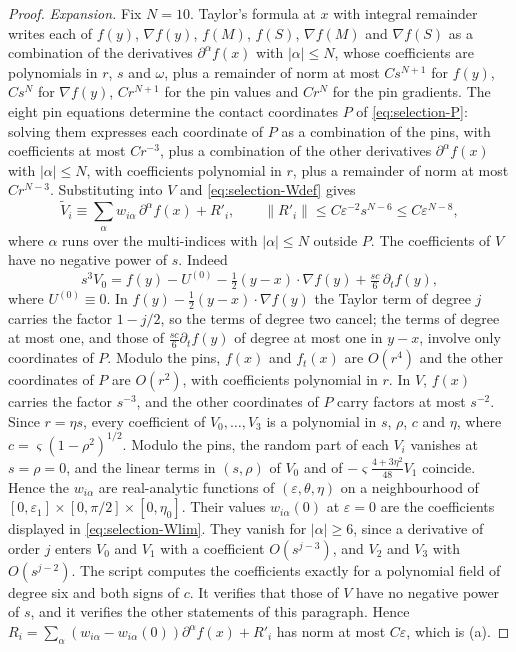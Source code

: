 \begin{proof}
\emph{Expansion.} Fix $N=10$. Taylor's formula at $x$ with integral remainder writes each of $f(y)$, $\nabla f(y)$, $f(M)$, $f(S)$, $\nabla f(M)$ and $\nabla f(S)$ as a combination of the derivatives $\partial^\alpha f(x)$ with $|\alpha|\le N$, whose coefficients are polynomials in $r$, $s$ and $\omega$, plus a remainder of norm at most $Cs^{N+1}$ for $f(y)$, $Cs^N$ for $\nabla f(y)$, $Cr^{N+1}$ for the pin values and $Cr^N$ for the pin gradients. The eight pin equations determine the contact coordinates $P$ of \eqref{eq:selection-P}: solving them expresses each coordinate of $P$ as a combination of the pins, with coefficients at most $Cr^{-3}$, plus a combination of the other derivatives $\partial^\alpha f(x)$ with $|\alpha|\le N$, with coefficients polynomial in $r$, plus a remainder of norm at most $Cr^{N-3}$. Substituting into $V$ and \eqref{eq:selection-Wdef} gives
\[
\tilde V_i\equiv\sum_\alpha w_{i\alpha}\,\partial^\alpha f(x)+R'_i,\qquad\|R'_i\|\le C\varepsilon^{-2}s^{N-6}\le C\varepsilon^{N-8},
\]
where $\alpha$ runs over the multi-indices with $|\alpha|\le N$ outside $P$. The coefficients of $V$ have no negative power of $s$. Indeed
\[
s^3V_0=f(y)-U^{(0)}-\tfrac12(y-x)\cdot\nabla f(y)+\tfrac{sc}6\,\partial_tf(y),
\]
where $U^{(0)}\equiv0$. In $f(y)-\frac12(y-x)\cdot\nabla f(y)$ the Taylor term of degree $j$ carries the factor $1-j/2$, so the terms of degree two cancel; the terms of degree at most one, and those of $\frac{sc}6\partial_tf(y)$ of degree at most one in $y-x$, involve only coordinates of $P$. Modulo the pins, $f(x)$ and $f_t(x)$ are $O(r^4)$ and the other coordinates of $P$ are $O(r^2)$, with coefficients polynomial in $r$. In $V$, $f(x)$ carries the factor $s^{-3}$, and the other coordinates of $P$ carry factors at most $s^{-2}$. Since $r=\eta s$, every coefficient of $V_0,\dots,V_3$ is a polynomial in $s$, $\rho$, $c$ and $\eta$, where $c=\varsigma(1-\rho^2)^{1/2}$. Modulo the pins, the random part of each $V_i$ vanishes at $s=\rho=0$, and the linear terms in $(s,\rho)$ of $V_0$ and of $-\varsigma\frac{4+3\eta^2}{48}V_1$ coincide. Hence the $w_{i\alpha}$ are real-analytic functions of $(\varepsilon,\theta,\eta)$ on a neighbourhood of $[0,\varepsilon_1]\times[0,\pi/2]\times[0,\eta_0]$. Their values $w_{i\alpha}(0)$ at $\varepsilon=0$ are the coefficients displayed in \eqref{eq:selection-Wlim}. They vanish for $|\alpha|\ge6$, since a derivative of order $j$ enters $V_0$ and $V_1$ with a coefficient $O(s^{j-3})$, and $V_2$ and $V_3$ with $O(s^{j-2})$. The script  computes the coefficients exactly for a polynomial field of degree six and both signs of $c$. It verifies that those of $V$ have no negative power of $s$, and it verifies the other statements of this paragraph. Hence $R_i=\sum_\alpha(w_{i\alpha}-w_{i\alpha}(0))\partial^\alpha f(x)+R'_i$ has norm at most $C\varepsilon$, which is (a).


\end{proof}
